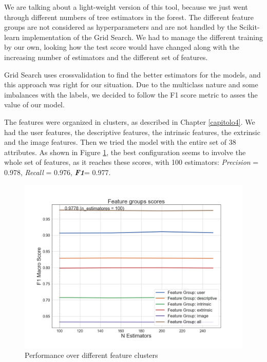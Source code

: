 We are talking about a light-weight version of this tool, because we just went through different numbers of tree estimators in the forest. The different feature groups are not considered as hyperparameters and are not handled by the Scikit-learn implementation of the Grid Search.
We had to manage the different training by our own, looking how the test score would have changed along with the increasing number of estimators and the different set of features.

Grid Search uses crossvalidation to find the better estimators for the models, and this approach was right for our situation.
Due to the multiclass nature and some imbalances with the labels, we decided to follow the F1 score metric to asses the value of our model.

The features were organized in clusters, as described in Chapter \ref{capitolo4}.
We had the user features, the descriptive features, the intrinsic features, the extrinsic and the image features. Then we tried the model with the entire set of 38 attributes.
As shown in Figure \ref{fig:feature_clusters}, the best configuration seems to involve the whole set of features, as it reaches these scores, with 100 estimators: \textit{Precision} = 0.978, \textit{Recall} = 0.976, \textbf{\textit{F1}}= 0.977.

\begin{figure}[htp!]
	\centering
	\includegraphics[width=\columnwidth]{chapter5/figure/feature_cluster_f1.png}
	\caption{Performance over different feature clusters}
	\label{fig:feature_clusters}
\end{figure}

